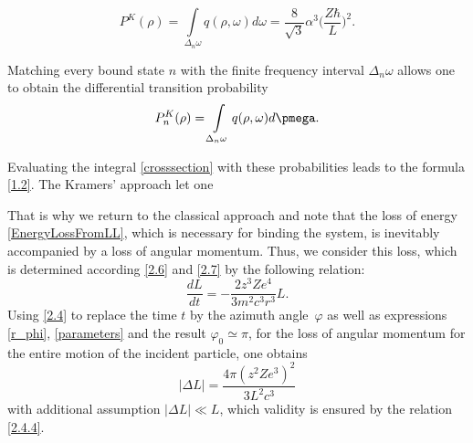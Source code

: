 \documentclass{SovJurn/JETPL}
\begin{document}
\begin{equation}
\label{fprobability}
P^K(\rho)=\int\limits_{\Delta_n\omega}q(\rho,\omega)d\omega=\dfrac{8}{\sqrt{3}}\alpha^3\bigg(\dfrac{Z\hbar}{L}\bigg)^2.
\end{equation}
\par Matching every bound state $n$ with the finite frequency interval $\Delta_n\omega$ allows one to obtain the differential transition probability
\begin{equation}
P_n^{K}(\rho)=\int\limits_{\Delta_n\omega}q(\rho,\omega)d\pmega.
\label{nprobability}
\end{equation}
\par Evaluating the integral \eqref{crosssection} with these probabilities leads to the formula \eqref {1.2}.%
The Kramers' approach let one 
\par That is why we return to the classical approach and note that the loss of energy \eqref{EnergyLossFromLL}, which is necessary for binding the system, is inevitably accompanied by a loss of angular momentum. Thus, we consider this loss, which is determined according \eqref{2.6} and \eqref{2.7} by the following relation:
\begin{equation}
\frac{dL}{dt}=-\dfrac{2z^3Ze^4}{3m^2c^3r^3}L.
\label{brem_an_mom}
\end{equation}
Using \eqref{2.4} to replace the time $t$ by the azimuth angle~$\varphi$ as well as expressions \eqref{r_phi}, \eqref{parameters} and the result $\varphi_0\simeq\pi$, for the loss of angular momentum for the entire motion of the incident particle, one obtains
\begin{equation}
|\Delta L|=\frac{4\pi (z^2Ze^3)^2}{3L^2c^3}
\label{ddl}
\end{equation}
with additional assumption $|\Delta L|\ll L$, which validity is ensured by the relation \eqref{2.4.4}.
\end{document}
